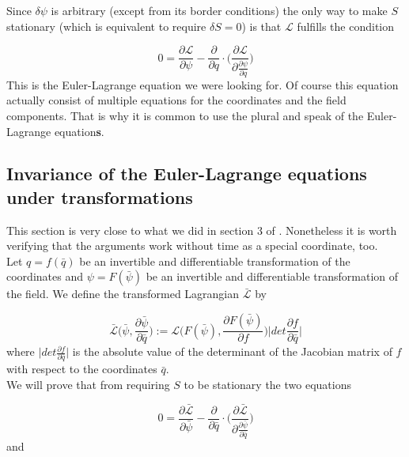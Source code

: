 \documentclass{article}
\begin{document}
Since $\delta \psi$ is arbitrary (except from its border conditions) the only way to make $S$ stationary (which is equivalent to require $\delta S = 0$) is that $\mathcal{L}$ fulfills the condition

\begin{equation} \label{EulerLagrangeField}
    0 = \frac{\partial \mathcal{L}}{\partial \psi}
    -\frac{\partial}{\partial q} \cdot \bigg( \frac{\partial \mathcal{L}}{\partial \frac{\partial \psi}{\partial q}} \bigg)
\end{equation}
This is the Euler-Lagrange equation we were looking for.
Of course this equation actually consist of multiple equations for the coordinates and the field components.
That is why it is common to use the plural and speak of the Euler-Lagrange equation\textbf{s}.

\subsection{Invariance of the Euler-Lagrange equations under transformations \cite{LagrangeOfField}} \label{LagrangeTranformation}

This section is very close to what we did in section 3 of \cite{LagrangeOfField}.
Nonetheless it is worth verifying that the arguments work without time as a special coordinate, too.
\\

Let $q=f(\bar{q})$ be an invertible and differentiable transformation of the coordinates and $\psi=F(\bar{\psi})$ be an invertible and differentiable transformation of the field.
We define the transformed Lagrangian  $\bar{\mathcal{L}}$ by

\begin{equation} \label{LagrTransform}
\bar{\mathcal{L}}\bigg(\bar{\psi}, \frac{\partial \bar{\psi}}{\partial \bar{q}}\bigg)
:= \mathcal{L}\bigg(F(\bar{\psi}) , \frac{\partial F(\bar{\psi})}{\partial f}\bigg)
\bigg| det \frac{\partial f}{\partial \bar{q}} \bigg|
\end{equation}
where $\big| det \frac{\partial f}{\partial \bar{q}} \big|$ is the absolute value of the determinant of the Jacobian matrix of $f$ with respect to the coordinates $\bar{q}$. \\

We will prove that from requiring $S$ to be stationary the two equations

\begin{equation} \label{ELGTransformed}
0 = \frac{\partial \bar{\mathcal{L}}}{\partial \bar{\psi}}
-\frac{\partial}{\partial \bar{q}} \cdot \bigg( \frac{\partial \mathcal{\bar{L}}}{\partial \frac{\partial \bar{\psi}}{\partial \bar{q}}} \bigg)
\end{equation}
and
\end{document}
